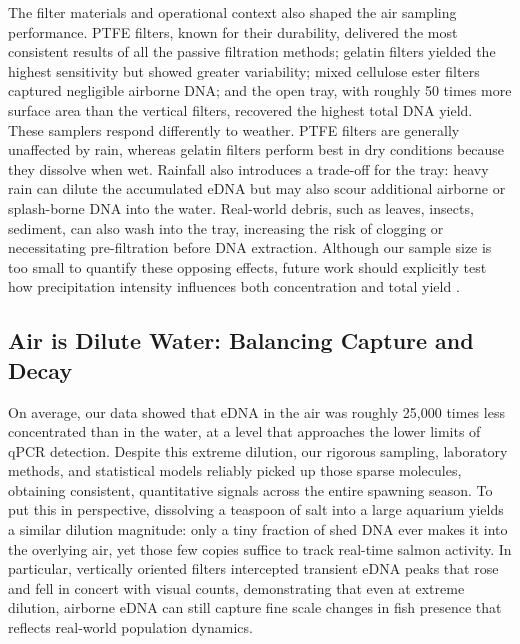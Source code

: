 \documentclass{article}
\begin{document}
The filter materials and operational context also shaped the air sampling performance. PTFE filters, known for their durability, delivered the most consistent results of all the passive filtration methods; gelatin filters yielded the highest sensitivity but showed greater variability; mixed cellulose ester filters captured negligible airborne DNA; and the open tray, with roughly 50 times more surface area than the vertical filters, recovered the highest total DNA yield. These samplers respond differently to weather. PTFE filters are generally unaffected by rain, whereas gelatin filters perform best in dry conditions because they dissolve when wet. Rainfall also introduces a trade-off for the tray: heavy rain can dilute the accumulated eDNA but may also scour additional airborne or splash-borne DNA into the water. Real-world debris, such as leaves, insects, sediment, can also wash into the tray, increasing the risk of clogging or necessitating pre-filtration before DNA extraction. Although our sample size is too small to quantify these opposing effects, future work should explicitly test how precipitation intensity influences both concentration and total yield \cite{johnson2023}. 

\subsection{Air is Dilute Water: Balancing Capture and Decay}
On average, our data showed that eDNA in the air was roughly 25,000 times less concentrated than in the water, at a level that approaches the lower limits of qPCR detection. Despite this extreme dilution, our rigorous sampling, laboratory methods, and statistical models reliably picked up those sparse molecules, obtaining consistent, quantitative signals across the entire spawning season. To put this in perspective, dissolving a teaspoon of salt into a large aquarium yields a similar dilution magnitude: only a tiny fraction of shed DNA ever makes it into the overlying air, yet those few copies suffice to track real-time salmon activity. In particular, vertically oriented filters intercepted transient eDNA peaks that rose and fell in concert with visual counts, demonstrating that even at extreme dilution, airborne eDNA can still capture fine scale changes in fish presence that reflects real-world population dynamics.
\end{document}
